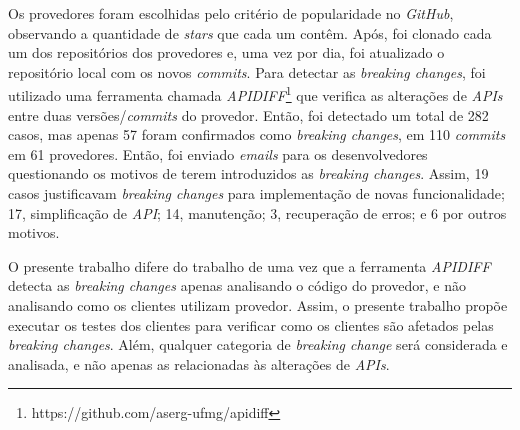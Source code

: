 Os provedores foram escolhidas pelo critério de popularidade no \textit{GitHub}, observando a quantidade de \textit{stars} que cada um contêm. Após, foi clonado cada um dos repositórios dos provedores e, uma vez por dia, foi atualizado o repositório local com os novos \textit{commits}. Para detectar as \textit{breaking changes}, foi utilizado uma ferramenta chamada \textit{APIDIFF}\footnote{https://github.com/aserg-ufmg/apidiff} que verifica as alterações de \textit{APIs} entre duas versões/\textit{commits} do provedor. Então, foi detectado um total de 282 casos, mas apenas 57 foram confirmados como \textit{breaking changes}, em 110 \textit{commits} em 61 provedores. Então, foi enviado \textit{emails} para os desenvolvedores questionando os motivos de terem introduzidos as \textit{breaking changes}. Assim, 19 casos justificavam \textit{breaking changes} para implementação de novas funcionalidade; 17, simplificação de \textit{API}; 14, manutenção; 3, recuperação de erros; e 6 por outros motivos.

O presente trabalho difere do trabalho de  uma vez que a ferramenta \textit{APIDIFF} detecta as \textit{breaking changes} apenas analisando o código do provedor, e não analisando como os clientes utilizam provedor. Assim, o presente trabalho propõe executar os testes dos clientes para verificar como os clientes são afetados pelas \textit{breaking changes}. Além, qualquer categoria de \textit{breaking change} será considerada e analisada, e não apenas as relacionadas às alterações de \textit{APIs}.